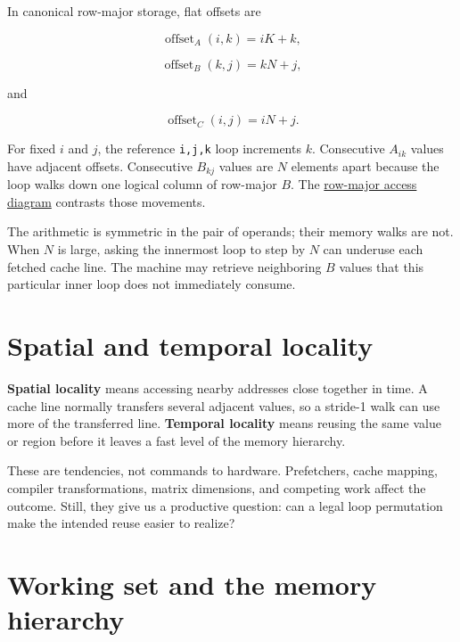 In canonical row-major storage, flat offsets are

\begin{equation}
\operatorname{offset}_A(i,k)=iK+k,
\end{equation}

\begin{equation}
\operatorname{offset}_B(k,j)=kN+j,
\end{equation}

and

\begin{equation}
\operatorname{offset}_C(i,j)=iN+j.
\end{equation}

For fixed \(i\) and \(j\), the reference \texttt{i,j,k} loop increments
\(k\). Consecutive \(A_{ik}\) values have adjacent offsets. Consecutive
\(B_{kj}\) values are \(N\) elements apart because the loop walks down
one logical column of row-major \(B\). The
\href{https://github.com/hermonai/inside-the-llm-engine/blob/astra-visual-rewrite/diagrams/linear/row-major-access.txt}{row-major
access diagram} contrasts those movements.

The arithmetic is symmetric in the pair of operands; their memory walks
are not. When \(N\) is large, asking the innermost loop to step by \(N\)
can underuse each fetched cache line. The machine may retrieve
neighboring \(B\) values that this particular inner loop does not
immediately consume.

\section{Spatial and temporal
locality}\label{spatial-and-temporal-locality}

\textbf{Spatial locality} means accessing nearby addresses close
together in time. A cache line normally transfers several adjacent
values, so a stride-1 walk can use more of the transferred line.
\textbf{Temporal locality} means reusing the same value or region before
it leaves a fast level of the memory hierarchy.

These are tendencies, not commands to hardware. Prefetchers, cache
mapping, compiler transformations, matrix dimensions, and competing work
affect the outcome. Still, they give us a productive question: can a
legal loop permutation make the intended reuse easier to realize?

\section{Working set and the memory
hierarchy}\label{working-set-and-the-memory-hierarchy}

